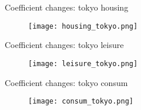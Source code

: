 \documentclass[aspectratio=169,xcolor=dvipsnames]{beamer}
\begin{document}
\begin{frame}{Coefficient changes: tokyo housing}
	\begin{figure}
		\texttt{[image: housing\_tokyo.png]}
	\end{figure}
\end{frame}
\begin{frame}{Coefficient changes: tokyo leisure}
	\begin{figure}
		\texttt{[image: leisure\_tokyo.png]}
	\end{figure}
\end{frame}
\begin{frame}{Coefficient changes: tokyo consum}
	\begin{figure}
		\texttt{[image: consum\_tokyo.png]}
	\end{figure}
\end{frame}

\end{document}
